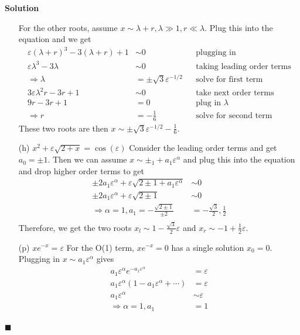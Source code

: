 \documentclass[11pt]{article}
\newcommand{\vep}{\varepsilon}
\theoremstyle{problemstyle}
\newenvironment{solution}
  {\noindent\textbf{Solution}\quad}
  {\hfill$\blacksquare$\par\vspace{1em}}
\begin{document}
\begin{solution}
\begin{enumerate}
      For the other roots, assume $x \sim \lambda + r, \lambda \gg 1, r \ll
      \lambda$. Plug this into the equation and we get
      \begin{align*}
        \vep(\lambda + r)^3 - 3(\lambda + r) + 1 & \sim 0 && \text{plugging in} \\
        \vep\lambda^3 -3\lambda & \sim 0 && \text{taking leading order terms} \\
        \Rightarrow \lambda & = \pm \sqrt{3}\vep^{-1/2} && \text{solve for first term} \\
        3\vep\lambda^2r -3r + 1 & \sim 0 && \text{take next order terms} \\
        9r - 3r + 1 & = 0 && \text{plug in } \lambda \\
        \Rightarrow r & = - \frac{1}{6} && \text{solve for second term}
      \end{align*}
      These two roots are then $x \sim \pm \sqrt{3}\vep^{-1/2} - \frac{1}{6}$.
    \item[(h)] $x^2 + \vep \sqrt{2+x} = \cos(\vep)$
      \newline
      Consider the leading order terms and get $a_0 = \pm 1$. Then we can assume
      $x \sim \pm_1 + a_1 \vep^\alpha$ and plug this into the equation and drop
      higher order terms to get
      \begin{align*}
        \pm 2 a_1 \vep^\alpha + \vep \sqrt{2 \pm 1 + a_1 \vep^\alpha} & \sim 0
        \\
        \pm 2 a_1 \vep^\alpha + \vep \sqrt{2 \pm 1} & \sim 0 \\
        \Rightarrow \alpha = 1, a_1 = -\frac{\sqrt{2 \pm 1}}{\pm 2} & =
        -\frac{\sqrt{3}}{2}, \frac{1}{2} \\
      \end{align*}
      Therefore, we get the two roots $x_l \sim 1 - \frac{\sqrt{3}}{2} \vep$ and
      $x_r \sim -1 + \frac{1}{2} \vep$.
    \item[(p)] $xe^{-x} = \vep$
      \newline
      For the O(1) term, $xe^{-x} = 0$ has a single solution $x_0 = 0$. Plugging
      in $x \sim a_1 \vep^\alpha$ gives
      \begin{align*}
        a_1 \vep^\alpha e^{-a_1 \vep^\alpha} & = \vep \\
        a_1 \vep^\alpha \left( 1 - a_1 \vep^\alpha + \cdots \right) & = \vep \\
        a_1 \vep^\alpha & \sim \vep \\
        \Rightarrow \alpha = 1, a_1 & = 1

\end{align*}
\end{enumerate}
\end{solution}
\end{document}
